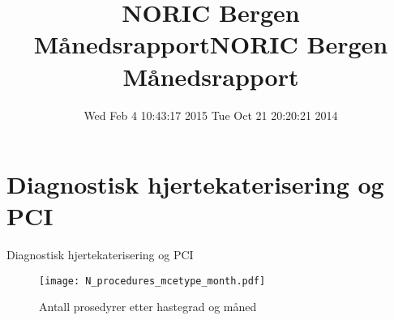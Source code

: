 \documentclass[presentation,xcolor=pdftex,dvipsnames,table]{beamer}
\title{NORIC Bergen \\Månedsrapport}\date{ Wed Feb  4 10:43:17 2015 }
\title{NORIC Bergen \\Månedsrapport}\date{ Tue Oct 21 20:20:21 2014 }
\begin{document}
\maketitle



\section{Diagnostisk hjertekaterisering og PCI}

\begin{frame}
\begin{Huge}
Diagnostisk hjertekaterisering og PCI
\end{Huge}
\end{frame}




\begin{frame}
\begin{figure}
  \centering
  \caption{Antall prosedyrer etter hastegrad og måned}
\texttt{[image: N\_procedures\_mcetype\_month.pdf]}
\end{figure}\end{frame}
\end{document}
